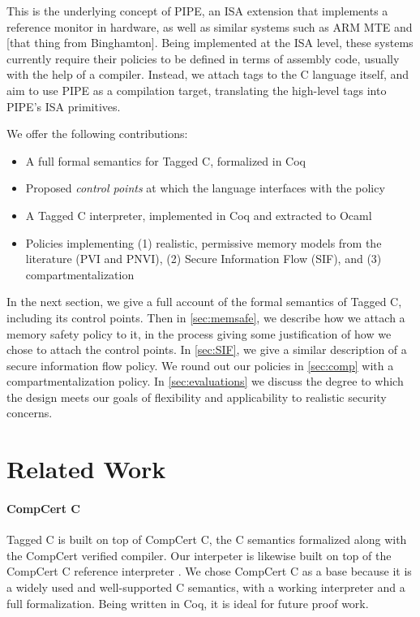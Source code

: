 \documentclass[acmsmall,review,anonymous]{acmart}\settopmatter{printfolios=true,printccs=false,printacmref=false}
\begin{document}
This is the underlying concept of PIPE, an ISA extension that implements a reference monitor in
hardware, as well as similar systems such as ARM MTE and [that thing from Binghamton]. Being
implemented at the ISA level, these systems currently require their policies to be defined in terms of
assembly code, usually with the help of a compiler. Instead, we attach tags to the C language
itself, and aim to use PIPE as a compilation target, translating the high-level tags into
PIPE's ISA primitives.

We offer the following contributions:

\begin{itemize}
\item A full formal semantics for Tagged C, formalized in Coq
\item Proposed {\em control points} at which the language interfaces with the policy
\item A Tagged C interpreter, implemented in Coq and extracted to Ocaml
\item Policies implementing (1) realistic, permissive memory models from the literature (PVI and PNVI),
  (2) Secure Information Flow (SIF), and (3) compartmentalization
\end{itemize}

In the next section, we give a full account of the formal semantics of Tagged C,
including its control points. Then in \cref{sec:memsafe}, we describe how we attach
a memory safety policy to it, in the process giving some justification of how we chose to
attach the control points. In \cref{sec:SIF}, we give a similar description of
a secure information flow policy. We round out our policies in \cref{sec:comp} with
a compartmentalization policy. In \cref{sec:evaluations} we discuss the degree to
which the design meets our goals of flexibility and applicability to realistic
security concerns.

\section{Related Work}

\paragraph{CompCert C}

Tagged C is built on top of CompCert C, the C semantics formalized along with the CompCert verified compiler.
Our interpeter is likewise built on top of the CompCert C reference interpreter \cite{Leroy09:CompCert}.
We chose CompCert C as a base because it is a widely used and well-supported C semantics, with a working
interpreter and a full formalization. Being written in Coq, it is ideal for future proof work.
\end{document}
